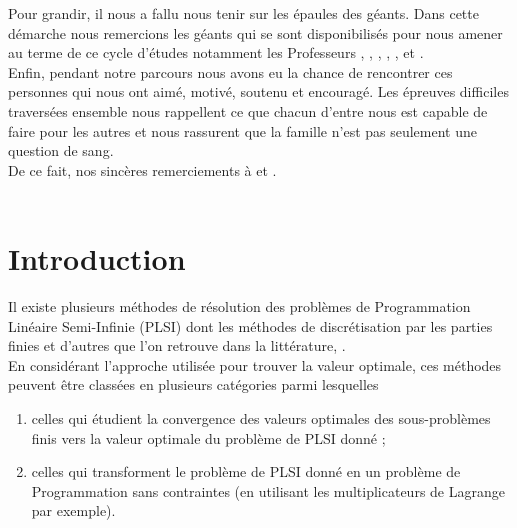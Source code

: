 \documentclass[11pt]{report}
\theoremstyle{styletheorem}
\theoremstyle{styledef}
\theoremstyle{remark}
\begin{document}
 	Pour grandir, il nous a fallu nous tenir sur les épaules des géants. Dans cette démarche nous remercions les géants qui se sont disponibilisés pour nous amener au terme de ce cycle d'études notamment les Professeurs , , , , ,  et  . \\
 	
 	Enfin, pendant notre parcours nous avons eu la chance de rencontrer ces personnes qui nous ont aimé, motivé, soutenu et encouragé. Les épreuves difficiles traversées ensemble nous rappellent ce que chacun d'entre nous est capable de faire pour les autres et nous rassurent que la famille n'est pas seulement une question de sang.\\
 	De ce fait, nos sincères remerciements à  et .\\ \\
 	
 	\begin{flushright}
 	\end{flushright}
 	
 	\chapter*{Introduction}
 	Il existe plusieurs méthodes de résolution des problèmes de Programmation Linéaire Semi-Infinie (PLSI)  dont les méthodes de discrétisation par les parties finies \cite{b2}\cite{b16} et d'autres que l'on retrouve dans la littérature, .\\ 
 	En considérant l'approche utilisée pour trouver la valeur optimale, ces méthodes peuvent être classées en plusieurs catégories parmi lesquelles
 	\begin{enumerate}
 		\item celles qui étudient la convergence des valeurs optimales des sous-problèmes finis vers la valeur optimale du problème de PLSI donné ; 
 		\item celles qui transforment le problème de PLSI donné en un problème de Programmation sans contraintes (en utilisant les multiplicateurs de Lagrange par exemple).  
 	\end{enumerate} 
 	
\end{document}
